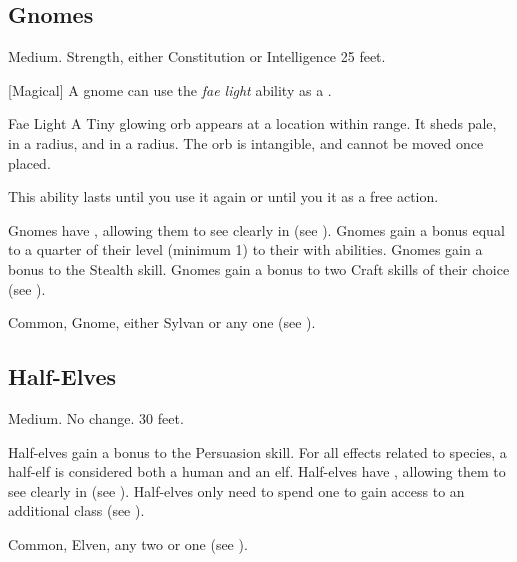     \subsection{Gnomes}
         Medium.
          Strength, either  Constitution or  Intelligence
         25 feet.
        \begin{raggeditemize}
            [Magical] A gnome can use the \textit{fae light} ability as a .
                \begin{freeability}{Fae Light}
                    A Tiny glowing orb appears at a location within \rngmed range.
                    It sheds pale,  in a \areasmall radius, and  in a \areamed radius.
                    The orb is intangible, and cannot be moved once placed.

                    This ability lasts until you use it again or until you  it as a free action.
                \end{freeability}
             Gnomes have , allowing them to see clearly in  (see ).
             Gnomes gain a bonus equal to a quarter of their level (minimum 1) to their  with  abilities.
             Gnomes gain a  bonus to the Stealth skill.
             Gnomes gain a  bonus to two Craft skills of their choice (see ).
        \end{raggeditemize}
         Common, Gnome, either Sylvan or any one  (see ).

    \subsection{Half-Elves}\label{Half-Elves}
         Medium.
         No change.
         30 feet.
        \begin{raggeditemize}
             Half-elves gain a  bonus to the Persuasion skill.
             For all effects related to species, a half-elf is considered both a human and an elf.
             Half-elves have , allowing them to see clearly in  (see ).
             Half-elves only need to spend one  to gain access to an additional class (see ).
        \end{raggeditemize}
         Common, Elven, any two  or one  (see ).

